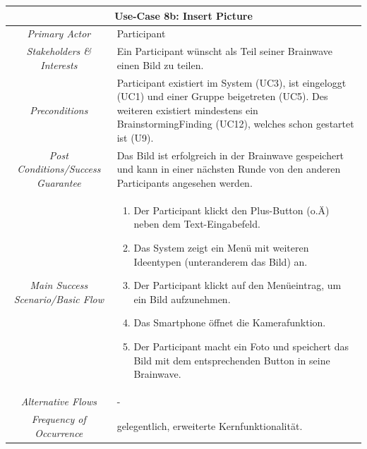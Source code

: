 \renewcommand{\arraystretch}{1.35}
\begin{center}
	\begin{longtable}{| c | p{7cm} |}
		\hline
		\multicolumn{2}{|c|}{\textbf{Use-Case 8b: Insert Picture}}\\
		\hline\hline
		\textit{Primary Actor} & Participant\\
		\hline
		\textit{Stakeholders \& Interests} & Ein Participant wünscht als Teil seiner Brainwave einen Bild zu teilen. \\
		\hline
		\textit{Preconditions} & Participant existiert im System (UC3), ist eingeloggt (UC1) und einer Gruppe beigetreten (UC5). Des weiteren existiert mindestens ein BrainstormingFinding (UC12), welches schon gestartet ist (U9).\\
		\hline
		\textit{Post Conditions/Success Guarantee} & Das Bild ist erfolgreich in der Brainwave gespeichert und kann in einer nächsten Runde von den anderen Participants angesehen werden.\\
		\hline
		\textit{Main Success Scenario/Basic Flow} & 
		\begin{enumerate}[noitemsep]
			\item Der Participant klickt den Plus-Button (o.Ä) neben dem Text-Eingabefeld.
			\item Das System zeigt ein Menü mit weiteren Ideentypen (unteranderem das Bild) an.
			\item Der Participant klickt auf den Menüeintrag, um ein Bild aufzunehmen.
			\item Das Smartphone öffnet die Kamerafunktion.
			\item Der Participant macht ein Foto und speichert das Bild mit dem entsprechenden Button in seine Brainwave.
		\end{enumerate}\\
		\hline
		\textit{Alternative Flows} &
		-\\
		\hline
		\textit{Frequency of Occurrence} & gelegentlich, erweiterte Kernfunktionalität.\\
		\hline
	\end{longtable}
\end{center}

